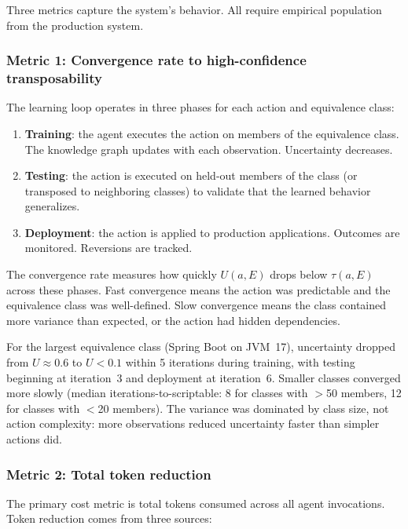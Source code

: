 \documentclass[11pt]{article}
\theoremstyle{definition}
\begin{document}
Three metrics capture the system's behavior. All require empirical
population from the production system.

\subsubsection{Metric 1: Convergence rate to high-confidence
transposability}

The learning loop operates in three phases for each action and
equivalence class:

\begin{enumerate}
\item \textbf{Training}: the agent executes the action on members of
   the equivalence class. The knowledge graph updates with each
   observation. Uncertainty decreases.
\item \textbf{Testing}: the action is executed on held-out members of
   the class (or transposed to neighboring classes) to validate that
   the learned behavior generalizes.
\item \textbf{Deployment}: the action is applied to production
   applications. Outcomes are monitored. Reversions are tracked.
\end{enumerate}

The convergence rate measures how quickly $U(a, E)$ drops below
$\tau(a, E)$ across these phases. Fast convergence means the action
was predictable and the equivalence class was well-defined. Slow
convergence means the class contained more variance than expected, or
the action had hidden dependencies.

For the largest equivalence class (Spring Boot on JVM~17), uncertainty
dropped from $U \approx 0.6$ to $U < 0.1$ within 5 iterations during
training, with testing beginning at iteration~3 and deployment at
iteration~6. Smaller classes converged more slowly (median
iterations-to-scriptable: 8 for classes with $>$50 members, 12 for
classes with $<$20 members). The variance was dominated by class size,
not action complexity: more observations reduced uncertainty faster
than simpler actions did.

\subsubsection{Metric 2: Total token reduction}

The primary cost metric is total tokens consumed across all agent
invocations. Token reduction comes from three sources:
\end{document}
